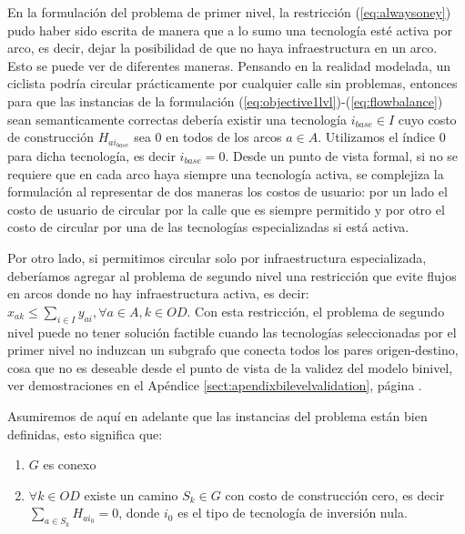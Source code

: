 
En la formulación del problema de primer nivel, la restricción (\ref{eq:alwaysoney}) pudo haber sido escrita de manera que a lo sumo una tecnología esté activa por arco, es decir, dejar la posibilidad de que no haya infraestructura en un arco. Esto se puede ver de diferentes maneras. Pensando en la realidad modelada, un ciclista podría circular prácticamente por cualquier calle sin problemas, entonces para que las instancias de la formulación (\ref{eq:objective1lvl})-(\ref{eq:flowbalance}) sean semanticamente correctas debería existir una tecnología $i_{base} \in I$ cuyo costo de construcción $H_{ai_{base}}$ sea 0 en todos de los arcos $a \in A$. Utilizamos el índice 0 para dicha tecnología, es decir $i_{base} = 0$. Desde un punto de vista formal, si no se requiere que en cada arco haya siempre una tecnología activa, se complejiza la formulación al representar de dos maneras los costos de usuario: por un lado el costo de usuario de circular por la calle que es siempre permitido y por otro el costo de circular por una de las tecnologías especializadas si está activa.

Por otro lado, si permitimos circular solo por infraestructura especializada, deberíamos agregar al problema de segundo nivel una restricción que evite flujos en arcos donde no hay infraestructura activa, es decir: $x_{ak} \leq \sum_{i \in I} y_{ai}, \forall a \in A, k \in OD$. Con esta restricción, el problema de segundo nivel puede no tener solución factible cuando las tecnologías seleccionadas por el primer nivel no induzcan un subgrafo que conecta todos los pares origen-destino, cosa que no es deseable desde el punto de vista de la validez del modelo binivel, ver demostraciones en el Apéndice \ref{sect:apendixbilevelvalidation}, página \pageref{sect:apendixbilevelvalidation}.

Asumiremos de aquí en adelante que las instancias del problema están bien definidas, esto significa que:

\begin{enumerate}
  \item {$G$ es conexo}
  \item {$\forall k \in OD$ existe un camino $S_k \in G$ con costo de construcción cero, es decir $\sum_{a \in S_k} H_{ai_0} = 0$}, donde $i_0$ es el tipo de tecnología de inversión nula.
\end{enumerate}

